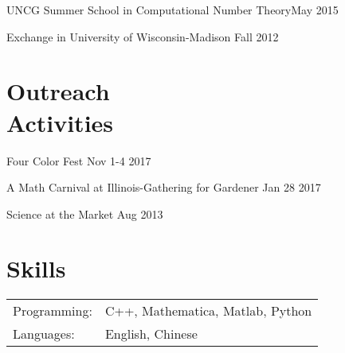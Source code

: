 \documentclass[margin,line,pifont,palatino,courier]{res}
\newenvironment{list1}{
  \begin{list}{\ding{113}}{%
      \setlength{\itemsep}{0in}
      \setlength{\parsep}{0in} \setlength{\parskip}{0in}
      \setlength{\topsep}{0in} \setlength{\partopsep}{0in}
      \setlength{\leftmargin}{0.17in}}}{\end{list}}
\begin{document}
\begin{resume}
\begin{list1}
\item  UNCG Summer School in Computational Number Theory{\hfill  May 2015}

\item  Exchange in {University of Wisconsin-Madison}    {\hfill   Fall 2012}
%	
%
%	
\end{list1}

\section{\sc Outreach \\Activities }
\begin{list1}
\item Four Color Fest {\hfill  Nov 1-4 2017}
\item A Math Carnival at Illinois-Gathering for Gardener  {\hfill  Jan 28 2017}
\item Science at the Market {\hfill  Aug 2013}
\end{list1}
\section{\sc Skills}

\begin{tabular}{@{}p{0.8in}p{6in}}
	Programming: &  C++, Mathematica, Matlab, Python\\
	Languages:& English, Chinese
\end{tabular}


\end{resume}
\end{document}
